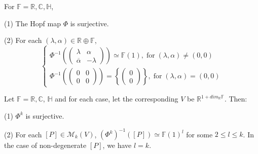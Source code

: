 \documentclass[10pt,a4paper]{amsart}
\begin{document}
\begin{lemma}
\label{surjection} For $\mathbb{F}=\mathbb{R},\mathbb{C},\mathbb{H}$,

(1) The Hopf map $\Phi$ is surjective.

(2) For each $(\lambda,\alpha)\in\mathbb{R}\oplus\mathbb{F}$,
\[%
\begin{cases}
\Phi^{-1}\left(
\begin{pmatrix}
\lambda & \alpha\\
\overline{\alpha} & -\lambda
\end{pmatrix}
\right)  \simeq\mathbb{F}(1),\;\text{for}\;(\lambda,\alpha)\neq(0,0)\\
\Phi^{-1}\left(
\begin{pmatrix}
0 & 0\\
0 & 0
\end{pmatrix}
\right)  =\left\{
\begin{pmatrix}
0\\
0
\end{pmatrix}
\right\}  ,\;\text{for}\;(\lambda,\alpha)=(0,0)
\end{cases}
\]

\end{lemma}

\begin{lemma}
\label{Phik} Let $\mathbb{F}=\mathbb{R},\mathbb{C}$, $\mathbb{H}$ and for each
case, let the corresponding $V$ be $\mathbb{R}^{1+dim_{\mathbb{R}}\mathbb{F}}%
$. Then:

(1) $\Phi^{k}$ is surjective.

(2) For each $[P]\in\mathcal{M}_{k}(V)$, $(\Phi^{k})^{-1}([P])\simeq
\mathbb{F}(1)^{l}$ for some $2\leq l\leq k$. In the case of non-degenerate
$[P]$, we have $l=k$.
\end{lemma}
\end{document}
